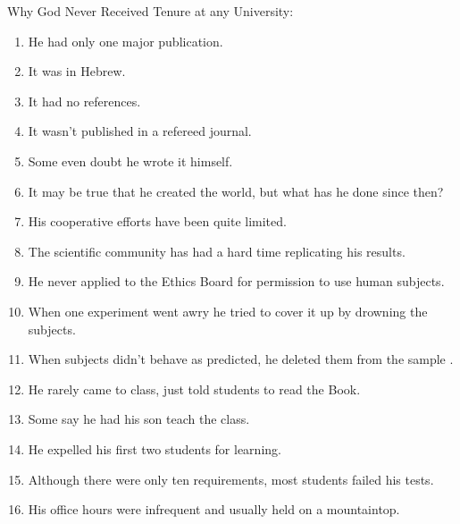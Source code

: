 Why God Never Received Tenure at any University:
\begin{enumerate}
	\item He had only one major publication.

	\item It was in Hebrew. 

	\item It had no references. 

	\item It wasn't published in a refereed journal.

	\item Some even doubt he wrote it himself. 

	\item It may be true that he created the world, but what has he done since then? 

	\item His cooperative efforts have been quite limited. 

	\item The scientific community has had a hard time replicating his results. 

	\item He never applied to the Ethics Board for permission to use human subjects.

	\item When one experiment went awry he tried to cover it up by drowning the subjects. 

	\item When subjects didn't behave as predicted, he deleted them from the sample . 

	\item He rarely came to class, just told students to read the Book. 

	\item Some say he had his son teach the class. 

	\item He expelled his first two students for learning. 

	\item Although there were only ten requirements, most students failed his tests. 

	\item His office hours were infrequent and usually held on a mountaintop.
\end{enumerate}

\begin{center}\underline{\hspace{5 cm}}\end{center}

